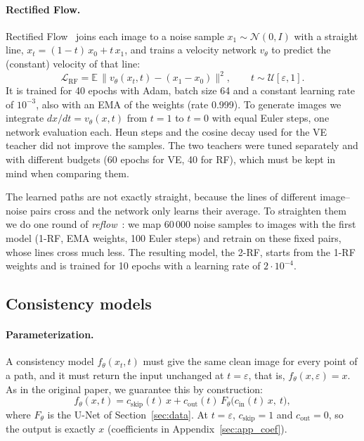 \documentclass{article}
\begin{document}
\paragraph{Rectified Flow.} Rectified Flow~\cite{liu2023flow} joins each image
to a noise sample $x_1 \sim \mathcal{N}(0, I)$ with a straight line,
$x_t = (1 - t)\, x_0 + t\, x_1$, and trains a velocity network $v_\theta$ to
predict the (constant) velocity of that line:
\begin{equation}
  \mathcal{L}_\text{RF} = \mathbb{E}\,\big\| v_\theta(x_t, t) - (x_1 - x_0) \big\|^2,
  \qquad t \sim \mathcal{U}[\varepsilon, 1].
\end{equation}
It is trained for 40 epochs with Adam, batch size 64 and a constant learning
rate of $10^{-3}$, also with an EMA of the weights (rate 0.999). To generate
images we integrate $dx/dt = v_\theta(x, t)$ from $t = 1$ to $t = 0$ with equal
Euler steps, one network evaluation each. Heun steps and the cosine decay used
for the VE teacher did not improve the samples. The two teachers were tuned
separately and with different budgets (60 epochs for VE, 40 for RF), which must
be kept in mind when comparing them.

The learned paths are not exactly straight, because the lines of different
image--noise pairs cross and the network only learns their average. To
straighten them we do one round of \emph{reflow}~\cite{liu2023flow}: we map
60\,000 noise samples to images with the first model (1-RF, EMA weights, 100
Euler steps) and retrain on these fixed pairs, whose lines cross much less. The
resulting model, the 2-RF, starts from the 1-RF weights and is trained for 10
epochs with a learning rate of $2\cdot10^{-4}$.

\subsection{Consistency models}
\label{sec:cm}

\paragraph{Parameterization.} A consistency model $f_\theta(x_t, t)$ must give
the same clean image for every point of a path, and it must return the input
unchanged at $t = \varepsilon$, that is, $f_\theta(x, \varepsilon) = x$. As in
the original paper, we guarantee this by construction:
\begin{equation}
  f_\theta(x, t) = c_\text{skip}(t)\, x + c_\text{out}(t)\, F_\theta\big(c_\text{in}(t)\, x,\ t\big),
\end{equation}
where $F_\theta$ is the U-Net of Section~\ref{sec:data}. At $t = \varepsilon$,
$c_\text{skip} = 1$ and $c_\text{out} = 0$, so the output is exactly $x$
(coefficients in Appendix~\ref{sec:app_coef}).
\end{document}
